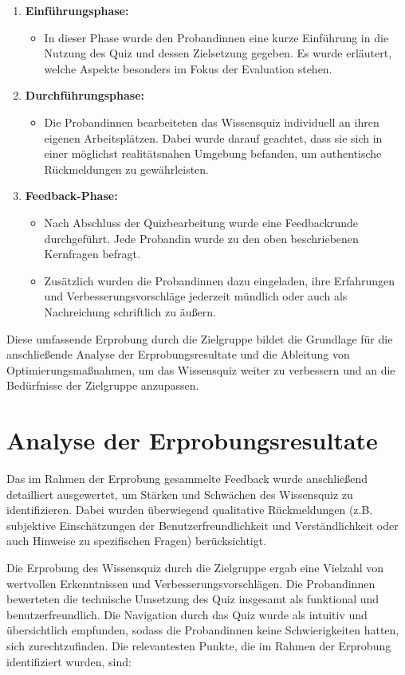 \begin{enumerate}
    \item \textbf{Einführungsphase:}
    \begin{itemize}
        \item In dieser Phase wurde den Probandinnen eine kurze Einführung in die Nutzung des Quiz und dessen Zielsetzung gegeben. Es wurde erläutert, welche Aspekte besonders im Fokus der Evaluation stehen.
    \end{itemize}
    \item \textbf{Durchführungsphase:}
    \begin{itemize}
        \item Die Probandinnen bearbeiteten das Wissensquiz individuell an ihren eigenen Arbeitsplätzen. Dabei wurde darauf geachtet, dass sie sich in einer möglichst realitätsnahen Umgebung befanden, um authentische Rückmeldungen zu gewährleisten.
    \end{itemize}
    \item \textbf{Feedback-Phase:}
    \begin{itemize}
        \item Nach Abschluss der Quizbearbeitung wurde eine Feedbackrunde durchgeführt. Jede Probandin wurde zu den oben beschriebenen Kernfragen befragt.
        \item Zusätzlich wurden die Probandinnen dazu eingeladen, ihre Erfahrungen und Verbesserungsvorschläge jederzeit mündlich oder auch als Nachreichung schriftlich zu äußern.
    \end{itemize}
\end{enumerate}
Diese umfassende Erprobung durch die Zielgruppe bildet die Grundlage für die anschließende Analyse der 
Erprobungsresultate und die Ableitung von Optimierungsmaßnahmen, um das Wissensquiz weiter zu verbessern 
und an die Bedürfnisse der Zielgruppe anzupassen.

\section{Analyse der Erprobungsresultate}
Das im Rahmen der Erprobung gesammelte Feedback wurde anschließend detailliert ausgewertet, um Stärken und 
Schwächen des Wissensquiz zu identifizieren. Dabei wurden überwiegend qualitative Rückmeldungen 
(z.B. subjektive Einschätzungen der Benutzerfreundlichkeit und Verständlichkeit oder auch Hinweise zu spezifischen Fragen) 
berücksichtigt.

Die Erprobung des Wissensquiz durch die Zielgruppe ergab eine Vielzahl von wertvollen Erkenntnissen 
und Verbesserungsvorschlägen. 
Die Probandinnen bewerteten die technische Umsetzung des Quiz insgesamt 
als funktional und benutzerfreundlich. Die Navigation durch das Quiz wurde als intuitiv und übersichtlich 
empfunden, sodass die Probandinnen keine Schwierigkeiten hatten, sich zurechtzufinden. 
Die relevantesten  Punkte, die im Rahmen der Erprobung identifiziert wurden, sind:

